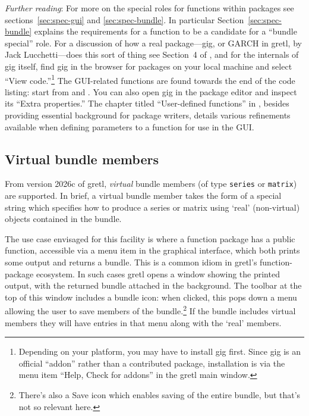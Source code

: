 \documentclass[oneside]{book}
\begin{document}
\textit{Further reading}: For more on the special roles for functions
within packages see sections~\ref{sec:spec-gui} and
\ref{sec:spec-bundle}. In particular Section~\ref{sec:spec-bundle}
explains the requirements for a function to be a candidate for a
``bundle special'' role. For a discussion of how a real
package---\textsf{gig}, or GARCH in gretl, by Jack Lucchetti---does
this sort of thing see Section~4 of \cite{addons-bundles}, and for the
internals of \textsf{gig} itself, find \textsf{gig} in the browser for
packages on your local machine and select ``View
code.''\footnote{Depending on your platform, you may have to install
  gig first. Since \textsf{gig} is an official ``addon'' rather than a
  contributed package, installation is via the menu item ``Help, Check
  for addons'' in the gretl main window.} The GUI-related functions
are found towards the end of the code listing: start from
 and . You can also
open \textsf{gig} in the package editor and inspect its ``Extra
properties.'' The chapter titled ``User-defined functions'' in
\cite{GUG}, besides providing essential background for package
writers, details various refinements available when defining
parameters to a function for use in the GUI.

\subsection{Virtual bundle members}

From version 2026c of gretl, \textit{virtual} bundle members (of type
\texttt{series} or \texttt{matrix}) are supported. In brief, a virtual
bundle member takes the form of a special string which specifies how
to produce a series or matrix using `real' (non-virtual) objects
contained in the bundle.

The use case envisaged for this facility is where a function package has
a public function, accessible via a menu item in the graphical
interface, which both prints some output and returns a bundle. This is a
common idiom in gretl's function-package ecosystem. In such cases gretl
opens a window showing the printed output, with the returned bundle
attached in the background.  The toolbar at the top of this window
includes a bundle icon: when clicked, this pops down a menu allowing the
user to save members of the bundle.\footnote{There's also a Save icon
  which enables saving of the entire bundle, but that's not so relevant
  here.} If the bundle includes virtual members they will have entries
in that menu along with the `real' members.
\end{document}
